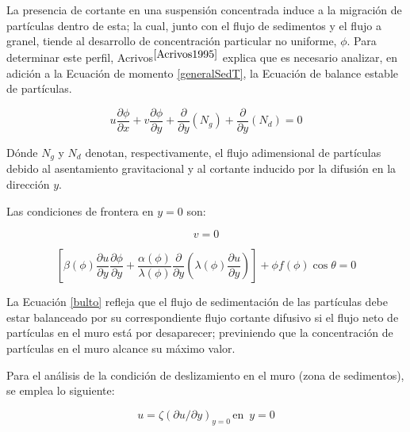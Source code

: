 \noindent
\justify

La presencia de cortante en una suspensi\'on concentrada induce a la migraci\'on de part\'iculas dentro de esta; la cual, junto con el flujo de sedimentos y el flujo a granel, tiende al desarrollo de concentraci\'on particular no uniforme, $\phi$. Para determinar este perfil, Acrivos$^{\cite{Acrivos1995}}$ explica que es necesario analizar, en adici\'on a la Ecuaci\'on de momento \ref{generalSedT}, la Ecuaci\'on de balance estable de part\'iculas.

\begin{equation}
	u \frac{\partial \phi}{\partial x} + v \frac{\partial \phi}{\partial y} + \frac{\partial}{\partial y} \left( N_g \right) + \frac{\partial}{\partial y} \left(N _d \right) = 0
	\label{balEs}
\end{equation}

\noindent
\justify

D\'onde $N_g$ y $N_d$ denotan, respectivamente, el flujo adimensional de part\'iculas debido al asentamiento gravitacional y al cortante inducido por la difusi\'on en la direcci\'on $y$.

\noindent
\justify

Las condiciones de frontera en $y=0$ son:

\begin{equation}
	v = 0
\end{equation}
	
\begin{equation}
	\left[\beta (\phi ) \frac{\partial u}{\partial y} \frac{\partial \phi}{\partial y} + \frac{\alpha (\phi )}{\lambda (\phi )} \frac{\partial}{\partial y} \left( \lambda (\phi ) \frac{\partial u}{\partial y} \right) \right] + \phi f (\phi ) \cos \theta = 0
	\label{bulto}
\end{equation}

\noindent
\justify

La Ecuaci\'on \ref{bulto} refleja que el flujo de sedimentaci\'on de las part\'iculas debe estar balanceado por su correspondiente flujo cortante difusivo si el flujo neto de part\'iculas en el muro est\'a por desaparecer; previniendo que la concentraci\'on de part\'iculas en el muro alcance su m\'aximo valor.

\noindent
\justify

Para el an\'alisis de la condici\'on de deslizamiento en el muro (zona de sedimentos), se emplea lo siguiente:

\begin{equation}
	u = \zeta \left( \partial u / \partial y \right) _{y=0} \, \text{en } \, y=0 
\end{equation}

